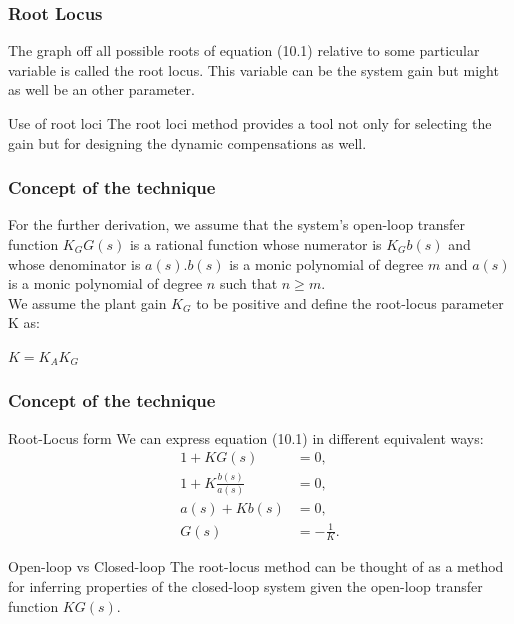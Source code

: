 \begin{frame}
\frametitle{Root Locus}
	\begin{definition}
		The graph off all possible roots of equation (10.1) relative to some particular variable is called the root locus. This variable can be the system gain but might as well be an other parameter.
	\end{definition}
	\vspace{1em}
	\begin{block}{Use of root loci}
		The root loci method provides a tool not only for selecting the gain but for designing the dynamic compensations as well.
	\end{block}
\end{frame}

\begin{frame}
\frametitle{Concept of the technique}
	For the further derivation, we assume that the system's open-loop transfer function $K_GG(s)$ is a rational function whose numerator is $K_Gb(s)$ and whose denominator is $a(s)$.$b(s)$ is a monic polynomial of degree $m$ and $a(s)$ is a monic polynomial of degree $n$ such that $n \geq m$.\\
	\vspace{1em}
	We assume the plant gain $K_G$ to be positive and define the root-locus parameter K as:
	\begin{center}
		$K = K_AK_G$
	\end{center}
\end{frame}

\begin{frame}
\frametitle{Concept of the technique}
\begin{block}{Root-Locus form}
	We can express equation (10.1) in different equivalent ways:
	\vspace{-1em}
	\begin{align*}
		1 + KG(s) &= 0,\\
		1 + K\frac{b(s)}{a(s)} &= 0,\\
		a(s) + Kb(s) &=0,\\
		G(s) & = -\frac{1}{K}.
	\end{align*}
\end{block}

\begin{alertblock}{Open-loop vs Closed-loop}
	The root-locus method can be thought of as a method for inferring properties of the closed-loop system given the open-loop transfer function $KG(s)$.
\end{alertblock}
\end{frame}

